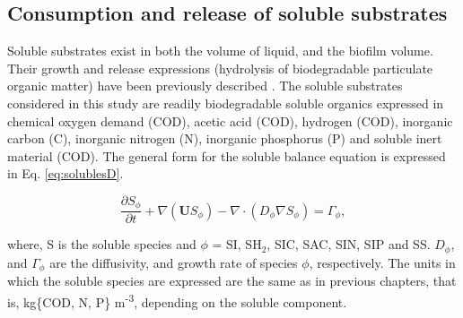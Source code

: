 \subsection{Consumption and release of soluble substrates}
Soluble substrates exist in both the volume of liquid, and the biofilm volume. Their growth and release expressions (hydrolysis of biodegradable particulate organic matter) have been previously described \cite{puyol2017}. The soluble substrates considered in this study are readily biodegradable soluble organics expressed in chemical oxygen demand (COD), acetic acid (COD), hydrogen (COD), inorganic carbon (C), inorganic nitrogen (N), inorganic phosphorus (P) and soluble inert material (COD). The general form for the soluble balance equation is expressed in Eq. \ref{eq:solublesD}.

\begin{equation}
\label{eq:solublesD}
\frac{\partial S_{\phi}}{\partial t} + \nabla (\mathbf{U} S_{\phi}) - \nabla \cdot (D_{\phi} \nabla S_{\phi}) = \Gamma_{\phi}, 
\end{equation}

where, S is the soluble species and ${\phi}$ = SI, SH${_2}$, SIC, SAC, SIN, SIP and SS. ${D_{\phi}}$, and ${\Gamma_{\phi}}$ are the diffusivity, and growth rate of species ${\phi}$, respectively. The units in which the soluble species are expressed are the same as in previous chapters, that is, kg\{COD, N, P\} m\textsuperscript{-3}, depending on the soluble component. 


